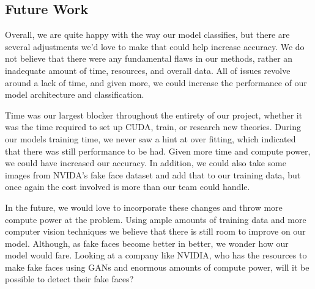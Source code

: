 \documentclass[11pt, letterpaper]{article}
\begin{document}
\begin{multicols}{2}
  \subsection{Future Work}
  Overall, we are quite happy with the way our model classifies, but
  there are several adjustments we'd love to make that could help
  increase accuracy. We do not believe that there were any fundamental
  flaws in our methods, rather an inadequate amount of time,
  resources, and overall data. All of issues revolve around a lack of
  time, and given more, we could increase the performance of our model
  architecture and classification.

  Time was our largest blocker throughout the entirety of our project, whether
  it was the time required to set up CUDA, train, or research new theories.
  During our models training time, we never saw a hint at over fitting, which
  indicated that there was still performance to be had. Given more time and
  compute power, we could have increased our accuracy. In addition, we could
  also take some images from NVIDA's fake face dataset and add that to our
  training data, but once again the cost involved is more than our team could
  handle.

  In the future, we would love to incorporate these changes and throw more
  compute power at the problem. Using ample amounts of training data and more
  computer vision techniques we believe that there is still room to improve on
  our model. Although, as fake faces become better in better, we wonder how our
  model would fare. Looking at a company like NVIDIA, who has the resources to
  make fake faces using GANs and enormous amounts of compute power, will it be
  possible to detect their fake faces?

\end{multicols}



\end{document}
